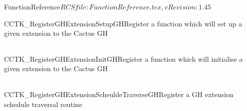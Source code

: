 \begin{cactuspart}{5}{FunctionReference}{$RCSfile: FunctionReference.tex,v $}{$Revision: 1.45 $}
\begin{CCTKFunc}{CCTK\_RegisterGHExtensionSetupGH}{Register a function which will set up a given extension to the Cactus GH}
\label{CCTK-RegisterGHExtensionSetupGH}
\showcargs
\begin{params}
\end{params}
\begin{discussion}
\end{discussion}
\begin{examples}
\begin{tabular}{@{}p{3cm}cp{11cm}}
\end{tabular}
\end{examples}
\begin{errorcodes}
\end{errorcodes}
\end{CCTKFunc}

\begin{CCTKFunc}{CCTK\_RegisterGHExtensionInitGH}{Register a function which will initialise a given extension to the Cactus GH}
\label{CCTK-RegisterGHExtensionInitGH}
\showcargs
\begin{params}
\end{params}
\begin{discussion}
\end{discussion}
\begin{examples}
\begin{tabular}{@{}p{3cm}cp{11cm}}
\end{tabular}
\end{examples}
\begin{errorcodes}
\end{errorcodes}
\end{CCTKFunc}

\begin{CCTKFunc}{CCTK\_RegisterGHExtensionScheuldeTraverseGH}{Register a GH extension schedule traversal routine}
\label{CCTK-RegisterGHExtensionScheduleTraverseGH}
\showcargs
\begin{params}
\end{params}
\begin{discussion}
\end{discussion}
\begin{examples}
\begin{tabular}{@{}p{3cm}cp{11cm}}
\end{tabular}
\end{examples}
\begin{errorcodes}
\end{errorcodes}
\end{CCTKFunc}




\end{cactuspart}
